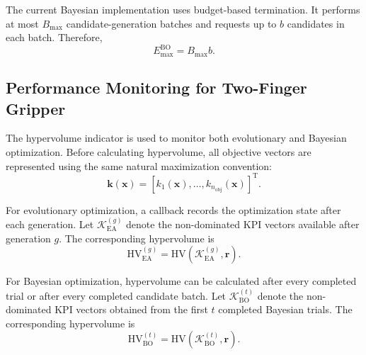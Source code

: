 The current Bayesian implementation uses budget-based termination. It performs at most $B_{\max}$
candidate-generation batches and requests up to $b$ candidates in each batch. Therefore,
\begin{equation}
    E_{\max}^{\mathrm{BO}}=B_{\max}b.
\end{equation}



\subsection{Performance Monitoring for Two-Finger Gripper}
\label{sec:two_finger_monitoring}

The hypervolume indicator is used to monitor both evolutionary and Bayesian
optimization. Before calculating hypervolume, all objective vectors are represented using the same
natural maximization convention:
\begin{equation}
    \mathbf{k}(\mathbf{x})
    =
    [k_1(\mathbf{x}),\ldots,k_{n_{\text{obj}}}(\mathbf{x})]^{\mathrm{T}}.
\end{equation}

For evolutionary optimization, a callback records the optimization state after each generation. Let
$\mathcal{K}_{\mathrm{EA}}^{(g)}$ denote the non-dominated KPI vectors available after generation
$g$. The corresponding hypervolume is
\begin{equation}
    \mathrm{HV}_{\mathrm{EA}}^{(g)}
    =
    \mathrm{HV}
    \left(
        \mathcal{K}_{\mathrm{EA}}^{(g)},
        \mathbf{r}
    \right).
\end{equation}

For Bayesian optimization, hypervolume can be calculated after every completed trial or after every
completed candidate batch. Let $\mathcal{K}_{\mathrm{BO}}^{(t)}$ denote the non-dominated KPI
vectors obtained from the first $t$ completed Bayesian trials. The corresponding hypervolume is
\begin{equation}
    \mathrm{HV}_{\mathrm{BO}}^{(t)}
    =
    \mathrm{HV}
    \left(
        \mathcal{K}_{\mathrm{BO}}^{(t)},
        \mathbf{r}
    \right).
\end{equation}

